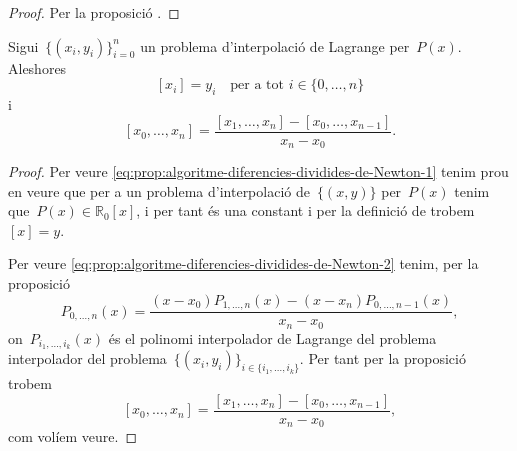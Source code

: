 \documentclass[../metodes-numerics.tex]{subfiles}
\begin{document}
    \begin{proof}
        Per la proposició .
    \end{proof}
    \begin{proposition}\label{prop:algoritme-diferencies-dividides-de-Newton}
        Sigui~\(\{(x_{i},y_{i})\}_{i=0}^{n}\) un problema d'interpolació de Lagrange per~\(P(x)\).
        Aleshores
        \begin{equation}\label{eq:prop:algoritme-diferencies-dividides-de-Newton-1}
        [x_{i}]=y_{i}\quad\text{per a tot }i\in\{0,\dots,n\}
        \end{equation}
        i
        \begin{equation}\label{eq:prop:algoritme-diferencies-dividides-de-Newton-2}
        [x_{0},\dots,x_{n}]=\frac{[x_{1},\dots,x_{n}]-[x_{0},\dots,x_{n-1}]}{x_{n}-x_{0}}.
        \end{equation}
    \end{proposition}
    \begin{proof}
        Per veure \eqref{eq:prop:algoritme-diferencies-dividides-de-Newton-1} tenim prou en veure que per a un problema d'interpolació de~\(\{(x,y)\}\) per~\(P(x)\) tenim que~\(P(x)\in\mathbb{R}_{0}[x]\), i per tant és una constant i per la definició de  trobem~\([x]=y\).

        Per veure \eqref{eq:prop:algoritme-diferencies-dividides-de-Newton-2} tenim, per la proposició 
        \[
            P_{0,\dots,n}(x)=\frac{\left(x-x_{0}\right)P_{1,\dots,n}(x)-\left(x-x_{n}\right)P_{0,\dots,n-1}(x)}{x_{n}-x_{0}},
        \]
        on~\(P_{i_{1},\dots,i_{k}}(x)\) és el polinomi interpolador de Lagrange del problema interpolador del problema~\(\{(x_{i},y_{i})\}_{i\in\{i_{1},\dots,i_{k}\}}\).
        Per tant per la proposició  trobem %
        \[
            [x_{0},\dots,x_{n}]=\frac{[x_{1},\dots,x_{n}]-[x_{0},\dots,x_{n-1}]}{x_{n}-x_{0}},
        \]
        com volíem veure.
    \end{proof}
\end{document}
